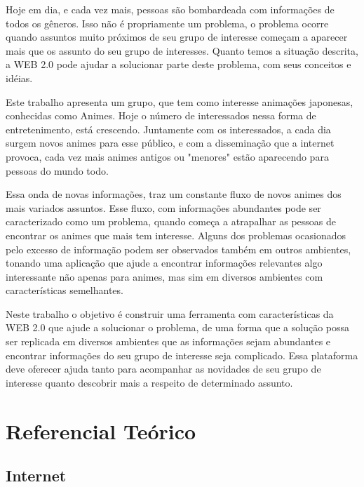 \documentclass[
	12pt,				%
	openright,			%
	twoside,			%
	a4paper,			%
	Times,
	brazil,				%
	]{abntex2}
\begin{document}
Hoje em dia, e cada vez mais, pessoas são bombardeada com informações de todos os gêneros. Isso não é propriamente um problema, o problema ocorre quando assuntos muito próximos de seu grupo de interesse começam a aparecer mais que os assunto do seu grupo de interesses. Quanto temos a situação descrita, a WEB 2.0 pode ajudar a solucionar parte deste problema, com seus conceitos e idéias.
\par

Este trabalho apresenta um grupo, que tem como interesse animações japonesas, conhecidas como Animes. Hoje o número de interessados nessa forma de entretenimento, está crescendo. Juntamente com os interessados, a cada dia surgem novos animes para esse público, e com a disseminação que a internet provoca, cada vez mais animes antigos ou "menores" estão aparecendo para pessoas do mundo todo.
\par

Essa onda de novas informações, traz um constante fluxo de novos animes dos mais variados assuntos. Esse fluxo, com informações abundantes pode ser caracterizado como um problema, quando começa a atrapalhar as pessoas de encontrar os animes que mais tem interesse. Alguns dos problemas ocasionados pelo excesso de informação podem ser observados também em outros ambientes, tonando uma aplicação que ajude a encontrar informações relevantes algo interessante não apenas para animes, mas sim em diversos ambientes com características semelhantes.
\par


Neste trabalho o objetivo é construir uma ferramenta com características da WEB 2.0 que ajude a solucionar o problema, de uma forma que a solução possa ser replicada em diversos ambientes que as informações sejam abundantes e encontrar informações do seu grupo de interesse seja complicado. Essa plataforma deve oferecer ajuda tanto para acompanhar as novidades de seu grupo de interesse quanto descobrir mais a respeito de determinado assunto.
\par

\chapter{Referencial Teórico}
\section{Internet}
\end{document}
